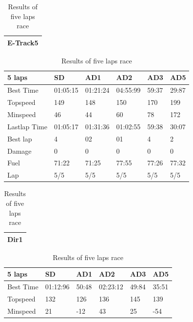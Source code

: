 \documentclass{llncs}
\begin{document}
\begin{table} [h!] 
	
	\caption{Results of five laps race}
	\label{resulta12}
	\begin{tabular}{ |p{15.2cm}|}
		\hline
		\textbf{E-Track5}   
		\\
		\hline
	\end{tabular}
	\begin{tabular}{ |p{3cm}|p{2cm}|p{2cm}|p{2 cm}|p{2 cm}|p{2 cm}|}
		\hline
		{ \color{blue}\textbf{5 laps} }&
		{ \color{red}\textbf{SD}}&  
		{ \color{red} \textbf{AD1} } &
		{ \color{red} \textbf{AD2} } &
		{ \color{red} \textbf{AD3} } &
		{ \color{red} \textbf{AD5} }
		\\
		\hline
		Best Time & 01:05:15  & 01:21:24  &04:55:99  & 59:37 & 29:87 
		\\
		\hline
		Topspeed & 149  & 148 & 150 & 170 & 199 
		\\
		\hline
		Minspeed & 46 & 44 & 60 & 78 & 172 
		\\
		\hline 
		
		
		Lastlap Time  & 01:05:17 & 01:31:36 & 01:02:55 & 59:38 & 30:07
		\\
		\hline 
		Best lap & 4 & 02 & 01 & 4 & 2 
		\\
		\hline
		Damage & 0 & 0 & 0 & 0 & 0 
		\\
		\hline 
		Fuel & 71:22 & 71:25 & 77:55 & 77:26 & 77:32 
		\\
		\hline 
		Lap & 5/5 & 5/5 & 5/5 & 5/5 & 5/5
		\\
		\hline	
	\end{tabular}
	\begin{tabular}{ |p{15.2cm}|}
		\hline
		\textbf{Dir1}   
		\\
		\hline
	\end{tabular}
	
	\begin{tabular}{ |p{3cm}|p{2cm}|p{2cm}|p{2 cm}|p{2 cm}|p{2 cm}|}
		\hline
		{ \color{blue}\textbf{5 laps} }&
		{ \color{red}\textbf{SD}}&  
		{ \color{red} \textbf{AD1} } &
		{ \color{red} \textbf{AD2} } &
		{ \color{red} \textbf{AD3} } &
		{ \color{red} \textbf{AD5} }
		\\
		\hline
		Best Time & 01:12:96 & 50:48  & 02:23:12 &49:84 & 35:51 
		\\
		\hline
		Topspeed & 132  & 126 & 136 & 145 & 139 
		\\
		\hline
		Minspeed &  21 & -12 & 43 & 25 & -54 
		\\
		\hline 
		

\end{tabular}
\end{table}
\end{document}
